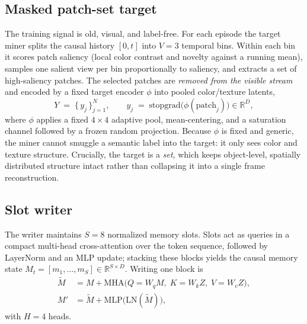 \subsection{Masked patch-set target}
The training signal is old, visual, and label-free.  For each episode the target
miner splits the causal history $[0,t]$ into $V{=}3$ temporal bins.  Within each
bin it scores patch saliency (local color contrast and novelty against a running
mean), samples one salient view per bin proportionally to saliency, and extracts
a set of high-saliency patches.  The selected patches are \emph{removed from the
visible stream} and encoded by a fixed target encoder $\phi$ into pooled
color/texture latents,
\begin{equation}
Y \;=\; \{\,y_j\,\}_{j=1}^{N}, \qquad
y_j \;=\; \mathrm{stopgrad}\!\big(\phi(\text{patch}_j)\big) \in \mathbb{R}^{D},
\label{eq:target}
\end{equation}
where $\phi$ applies a fixed $4{\times}4$ adaptive pool, mean-centering, and a
saturation channel followed by a frozen random projection.  Because $\phi$ is
fixed and generic, the miner cannot smuggle a semantic label into the target: it
only sees color and texture structure.  Crucially, the target is a \emph{set},
which keeps object-level, spatially distributed structure intact rather than
collapsing it into a single frame reconstruction.

\subsection{Slot writer}
The writer maintains $S{=}8$ normalized memory slots.  Slots act as queries in a
compact multi-head cross-attention over the token sequence, followed by
LayerNorm and an MLP update; stacking these blocks yields the causal memory
state $M_t=[m_1,\dots,m_S]\in\mathbb{R}^{S\times D}$.  Writing one block is
\begin{align}
\tilde{M} &= M + \mathrm{MHA}\big(Q{=}W_q M,\; K{=}W_k Z,\; V{=}W_v Z\big),\\
M' &= \tilde{M} + \mathrm{MLP}\big(\mathrm{LN}(\tilde{M})\big),
\label{eq:slot}
\end{align}
with $H{=}4$ heads.

